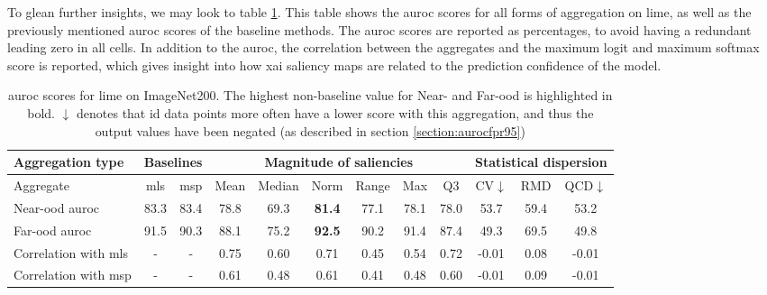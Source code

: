 \documentclass[UKenglish]{uiomasterthesis} %
\theoremstyle{definition}
\begin{document}
To glean further insights, we may look to table \ref{table:imagenet200_lime_metrics}. This table shows the \ac{auroc} scores for all forms of aggregation on \ac{lime}, as well as the previously mentioned \ac{auroc} scores of the baseline methods. The \ac{auroc} scores are reported as percentages, to avoid having a redundant leading zero in all cells. In addition to the \ac{auroc}, the correlation between the aggregates and the maximum logit and maximum softmax score is reported, which gives insight into how \ac{xai} saliency maps are related to the prediction confidence of the model.

\begin{table}[hbtp]
\setlength\tabcolsep{3pt}
\begin{center}
\begin{tabular}{ |p{5.1em}|c c|c c c c c c|c c c| }
    \hline
     \centering Aggregation type & \multicolumn{2}{c|}{Baselines} & \multicolumn{6}{c|}{Magnitude of saliencies} & \multicolumn{3}{p{8em}|}{\centering Statistical dispersion} \\
    \hline
    Aggregate & \ac{mls} & \ac{msp} & Mean & Median & Norm & Range & Max & Q3 & CV$\downarrow$ & RMD & QCD$\downarrow$  \\
    \hline
    \rowcolor{near!50}
    Near-\ac{ood} \ac{auroc} & 83.3 & 83.4 & 78.8 & 69.3 &\textbf{ 81.4 }& 77.1 & 78.1 & 78.0 & 53.7 & 59.4 & 53.2  \\
    \hline
    \rowcolor{far!50}
    Far-\ac{ood} \ac{auroc} & 91.5 & 90.3 & 88.1 & 75.2 &\textbf{ 92.5 }& 90.2 & 91.4 & 87.4 & 49.3 & 69.5 & 49.8  \\
    \hline
    Correlation with \ac{mls}& - & - & 0.75 & 0.60 & 0.71 & 0.45 & 0.54 & 0.72 & -0.01 & 0.08 & -0.01  \\
    \hline
    Correlation with \ac{msp}& - & - & 0.61 & 0.48 & 0.61 & 0.41 & 0.48 & 0.60 & -0.01 & 0.09 & -0.01  \\
    \hline
    \end{tabular}
    \caption[\ac{auroc} scores for \ac{lime} on ImageNet200]{\ac{auroc} scores for \ac{lime} on ImageNet200. The highest non-baseline value for Near- and Far-\ac{ood} is highlighted in bold. $\downarrow$ denotes that \ac{id} data points more often have a lower score with this aggregation, and thus the output values have been negated (as described in section \ref{section:aurocfpr95})}
    \label{table:imagenet200_lime_metrics}
\end{center}
\setlength\tabcolsep{6pt}
\end{table}
\end{document}
